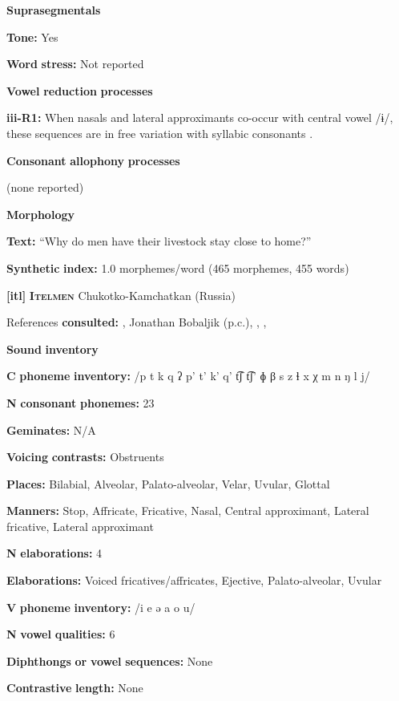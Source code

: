 \begin{styleBody}
\textbf{Suprasegmentals}

\textbf{Tone:} Yes

\textbf{Word} \textbf{stress:} Not reported

\textbf{Vowel} \textbf{reduction} \textbf{processes}

\textbf{iii-R1:} When nasals and lateral approximants co-occur with central vowel /ɨ/, these sequences are in free variation with syllabic consonants \citep[31]{Gerner2013}.

\textbf{Consonant} \textbf{allophony} \textbf{processes}

(none reported)

\textbf{Morphology}

\textbf{Text:} “Why do men have their livestock stay close to home?” \citep[525-530]{Gerner2013}

\textbf{Synthetic} \textbf{index:} 1.0 morphemes/word (465 morphemes, 455 words)

\textbf{[itl]}   \textbf{\textsc{Itelmen}}  Chukotko-Kamchatkan (Russia)

References \textbf{consulted:} \citet{Bobaljik2006}, Jonathan Bobaljik (p.c.), \citet{GeorgVolodin1999}, \citet{Volodin1976}, \citet{VolodinZhukova1968}

\textbf{Sound} \textbf{inventory}

\textbf{C} \textbf{phoneme} \textbf{inventory:} /p t k q ʔ p’ t’ k’ q’ t͡ʃ t͡ʃ’ ɸ β s z ɬ x χ m n ŋ l j/

\textbf{N} \textbf{consonant} \textbf{phonemes:} 23

\textbf{Geminates:} N/A

\textbf{Voicing} \textbf{contrasts:} Obstruents

\textbf{Places:} Bilabial, Alveolar, Palato-alveolar, Velar, Uvular, Glottal

\textbf{Manners:} Stop, Affricate, Fricative, Nasal, Central approximant, Lateral fricative, Lateral approximant

\textbf{N} \textbf{elaborations:} 4

\textbf{Elaborations:} Voiced fricatives/affricates, Ejective, Palato-alveolar, Uvular

\textbf{V} \textbf{phoneme} \textbf{inventory:} /i e ə a o u/

\textbf{N} \textbf{vowel} \textbf{qualities:} 6

\textbf{Diphthongs} \textbf{or} \textbf{vowel} \textbf{sequences:} None

\textbf{Contrastive} \textbf{length:} None


\end{styleBody}
